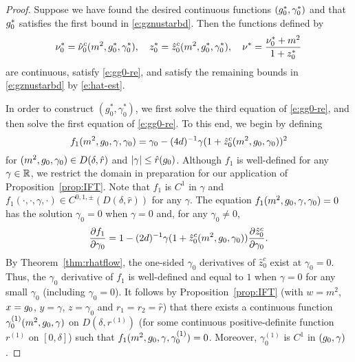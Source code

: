 \begin{proof}
Suppose we have found the desired continuous functions $(g_0^*, \gamma_0^*)$
and that $g_0^*$ satisfies the first bound in \eqref{e:gznustarbd}.
Then the functions defined by
\begin{equation}
\nu_0^* = \hat\nu_0^c(m^2, g_0^*, \gamma_0^*),
	\quad
z_0^* = \hat z_0^c(m^2, g_0^*, \gamma_0^*),
	\quad
\nu^* = \frac{\nu_0^* + m^2}{1 + z_0^*}
\end{equation}
are continuous, satisfy \eqref{e:gg0-re}, and satisfy the remaining bounds in
\eqref{e:gznustarbd} by \eqref{e:hat-est}.

In order to construct $(g_0^*, \gamma_0^*)$, we first solve the third equation
of \eqref{e:gg0-re}, and then solve the first equation of \eqref{e:gg0-re}.
To this end, we begin by defining
\begin{equation}
f_1(m^2, g_0, \gamma, \gamma_0)
	=
\gamma_0 - (4d)^{-1} \gamma (1 + \hat z_0^c(m^2, g_0, \gamma_0))^2
\end{equation}
for $(m^2, g_0, \gamma_0) \in D(\delta, \hat r)$
and $|\gamma| \le \hat r(g_0)$.
Although $f_1$ is well-defined
for any $\gamma \in {\mathbb R}$, we restrict the domain in preparation
for our application of Proposition~\ref{prop:IFT}.
Note that $f_1$ is $C^1$ in $\gamma$ and
$f_1(\cdot, \cdot, \gamma, \cdot) \in C^{0,1,\pm}(D(\delta, \hat r))$ for any $\gamma$.
The equation $f_1(m^2, g_0, \gamma, \gamma_0) = 0$
has the solution $\gamma_0 = 0$ when $\gamma = 0$
and, for any $\gamma_0 \neq 0$,
\begin{equation}
\frac{\partial f_1}{\partial \gamma_0}
	=
1 - (2d)^{-1} \gamma (1 + \hat z_0^c(m^2, g_0, \gamma_0)) \frac{\partial \hat z_0^c}{\partial \gamma_0}.
\end{equation}
By Theorem~\ref{thm:rhatflow}, the one-sided $\gamma_0$ derivatives of $\hat z_0^c$ exist
at $\gamma_0 = 0$. Thus, the $\gamma_0$ derivative of $f_1$ is well-defined
and equal to $1$ when $\gamma = 0$ for any small $\gamma_0$ (including $\gamma_0 = 0$).
It follows by Proposition~\ref{prop:IFT}
(with $w = m^2$, $x = g_0$, $y = \gamma$, $z = \gamma_0$ and $r_1 = r_2 = \hat r$)
that there exists a continuous function $\gamma^{(1)}_0(m^2, g_0, \gamma)$
on $D(\delta, r^{(1)})$ (for some continuous positive-definite function $r^{(1)}$ on $[0, \delta]$)
such that $f_1(m^2, g_0, \gamma, \gamma^{(1)}_0) = 0$.
Moreover, $\gamma^{(1)}_0$ is $C^1$ in $(g_0, \gamma)$.


\end{proof}
